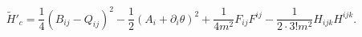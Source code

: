 \begin{equation}
\widetilde{H}'_c = \frac{1}{4}(B_{ij}-Q_{ij})^2-\frac{1}{2}(A_i+
\partial_i\theta)^2+\frac{1}{4m^2}F_{ij}F^{ij}-\frac{1}{2\cdot3!m^2}
H_{ijk}H^{ijk}.
\end{equation}

